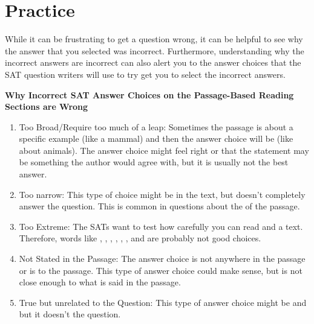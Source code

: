 \section{Practice}

While it can be frustrating to get a question wrong, it can be helpful to see why the answer that
you selected was incorrect. Furthermore, understanding why the incorrect answers are incorrect
can also alert you to the answer choices that the SAT question writers will use to try get you to
select the incorrect answers.


\textbf{Why Incorrect SAT Answer Choices on the Passage-Based Reading Sections are
Wrong}

\begin{enumerate}
\item Too Broad/Require too much of a leap: Sometimes the passage is about a specific
example (like a mammal) and then the answer choice will be \underline{\hspace{2in}}
(like about animals). The answer choice might feel right or that the statement may be
something the author would agree with, but it is usually not the best answer.

\item Too narrow: This type of choice might be in the text, but \underline{\hspace{2in}}
doesn't completely answer the question. This is common in questions about the \underline{\hspace{2in}}
of the passage.

\item Too Extreme: The SATs want to test how carefully you can read and
a text. Therefore, words like , \underline{\hspace{2in}}, \underline{\hspace{2in}}, \underline{\hspace{2in}}, \underline{\hspace{2in}}, \underline{\hspace{2in}}, and \underline{\hspace{2in}} are probably not good choices.

\item Not Stated in the Passage: The answer choice is not \underline{\hspace{2in}} anywhere in the passage or is \underline{\hspace{2in}} to the passage. This type of answer choice could make sense, but is not close enough to what is said in the passage.

\item True but unrelated to the Question: This type of answer choice might be \underline{\hspace{2in}}
and \underline{\hspace{2in}} but it doesn't \underline{\hspace{2in}} the question.

\end{enumerate}
